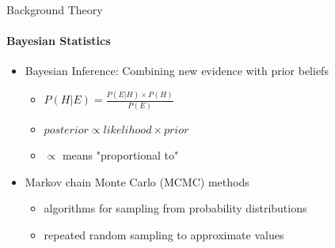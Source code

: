 \documentclass[letter,graphicx]{beamer}
\begin{document}
\begin{frame}{Background Theory}
\framesubtitle{Bayesian Statistics}
\begin{itemize}
\item Bayesian Inference: Combining new evidence with prior beliefs
	\vspace{1mm}
	\begin{itemize}
	\item $P(H|E) = \frac{P(E|H) \times P(H)}{P(E)}$
	\vspace{2mm}
	\item $posterior \propto likelihood \times prior$
	\vspace{2mm}
	\item $\propto$ means "proportional to"
	\end{itemize}
	\vspace{2mm}
\item Markov chain Monte Carlo (MCMC) methods
	\vspace{1mm}
	\begin{itemize}
	\item algorithms for sampling from probability distributions
	\vspace{2mm}
	\item repeated random sampling to approximate values
	\end{itemize}
\end{itemize}
\end{frame}
\end{document}
